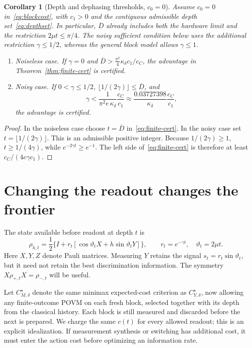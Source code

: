 \documentclass[11pt,a4paper]{article}
\newtheorem{corollary}[theorem]{Corollary}
\theoremstyle{definition}
\theoremstyle{remark}
\numberwithin{equation}{section}
\begin{document}
\begin{corollary}[Depth and dephasing thresholds, $c_0=0$]\label{cor:thresholds}
Assume $c_0=0$ in~\eqref{eq:blockcost}, with $c_1>0$ and the contiguous
admissible depth set~\eqref{eq:depthset}. In particular, $\overline D$
already includes both the hardware limit and the restriction
$2\mu t\leq\pi/4$.
The noisy sufficient condition below uses the additional restriction
$\gamma\leq1/2$, whereas the general block model allows $\gamma\leq1$.
\leavevmode
\begin{enumerate}
\item \emph{Noiseless case.} If $\gamma=0$ and
$\overline D>\frac{\pi^2}{4}\kappa_\delta c_1/c_C$, the advantage in
Theorem~\ref{thm:finite-cert} is certified.
\item \emph{Noisy case.} If $0<\gamma\le1/2$,
$\lfloor1/(2\gamma)\rfloor\le\overline D$, and
\begin{equation}\label{eq:noise-threshold}
\gamma<\frac1{\pi^2e\,\kappa_\delta}\frac{c_C}{c_1}
\approx\frac{0.03727398}{\kappa_\delta}\frac{c_C}{c_1},
\end{equation}
the advantage is certified.
\end{enumerate}
\end{corollary}
\begin{proof}
In the noiseless case choose $t=\overline D$ in~\eqref{eq:finite-cert}.
In the noisy case set $t=\lfloor1/(2\gamma)\rfloor$. This is an admissible
positive integer. Because $1/(2\gamma)\ge1$,
$t\ge1/(4\gamma)$, while $e^{-2\gamma t}\ge e^{-1}$. The left side
of~\eqref{eq:finite-cert} is therefore at least $c_C/(4e\gamma c_1)$.
\end{proof}

\section{Changing the readout changes the frontier}\label{sec:measurements}
The state available before readout at depth $t$ is
\begin{equation}\label{eq:blockstates}
 \rho_{h,t}=\frac12\{I+r_t[\cos\vartheta_t X+h\sin\vartheta_t Y]\},
 \qquad r_t=e^{-\gamma t},\quad \vartheta_t=2\mu t.
\end{equation}
Here $X,Y,Z$ denote Pauli matrices. Measuring $Y$ retains the signal
$s_t=r_t\sin\vartheta_t$, but it need not retain the best discrimination
information. The symmetry $X\rho_{+,t}X=\rho_{-,t}$ will be useful.

Let $C_{M,\delta}^\star$ denote the same minimax expected-cost criterion
as $C_{Y,\delta}^\star$, now allowing any finite-outcome POVM on each
fresh block, selected together with its depth from the classical history.
Each block is still measured and discarded before the next is prepared.
We charge the same $c(t)$ for every allowed readout; this is an explicit
idealization. If measurement synthesis or switching has additional cost,
it must enter the action cost before optimizing an information rate.
\end{document}
